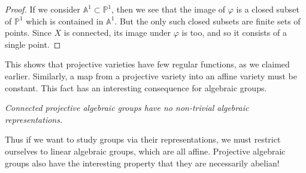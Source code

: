 \documentclass[12pt]{amsart}
\begin{document}
\begin{proof}
If we consider ${\mathbb A}^1\subset{\mathbb P}^1$, then we see that the
image of $\varphi$ is a closed subset of ${\mathbb P}^1$ which is contained
in ${\mathbb A}^1$.
But the only such closed subsets are finite sets of points.
Since $X$ is connected, its image under $\varphi$ is too, and so it consists
of a single point.
\end{proof}

This shows that projective varieties have few regular functions, as we
claimed earlier.
Similarly, a map from a projective variety into an affine variety must be
constant. 
This fact has an interesting consequence for algebraic groups.
\medskip

{\it
Connected projective algebraic groups have no non-trivial algebraic
representations. 
}\medskip

Thus if we want to study groups via their representations, we must restrict
ourselves to linear algebraic groups, which are all affine.
Projective algebraic groups also have the interesting property that they are 
necessarily abelian!
\end{document}
